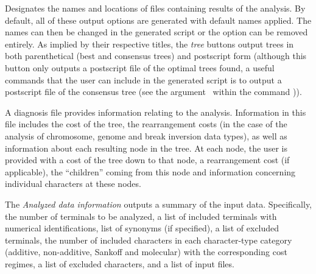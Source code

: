 \begin{description}
\setlength{\parindent}{0.5cm}	   
        \item[Output Files]
        		Designates the names and locations of files containing results of the analysis. 
        		By default, all of these output options are generated with default names applied.  The names can 
      		then be changed in the generated script or the option can be removed entirely.  As implied by their 
        		respective titles, the \emph{tree} buttons output trees in both parenthetical (best and 
        		consensus trees) and postscript form (although this button only outputs a postscript file of the optimal trees
		found, a useful commands that the user can include in the generated script is to output 
		a postscript file of the consensus tree (see the argument~ 
		within the command )). 
        
        		\indent A diagnosis file provides information relating to the analysis. Information in this file includes 
		the cost of the tree, the rearrangement costs (in the case of the analysis of chromosome, genome and 
		break inversion data types), as well as information about each resulting node in the tree.  At each node, 
		the user is provided with a cost of the tree down to that node, a rearrangement cost (if applicable), the ``children'' 
		coming from this node and information concerning individual characters at these nodes.
		
		\indent The \emph{Analyzed data information} outputs a summary of the input data. Specifically, 
		the number of terminals to be analyzed, a list of included terminals with numerical identifications, 
		list of synonyms (if specified), a list of excluded terminals, the number of included characters in each 
		character-type category (additive, non-additive, Sankoff and molecular) with the corresponding cost 
		regimes, a list of excluded characters, and a list of input files.    
\end{description}

